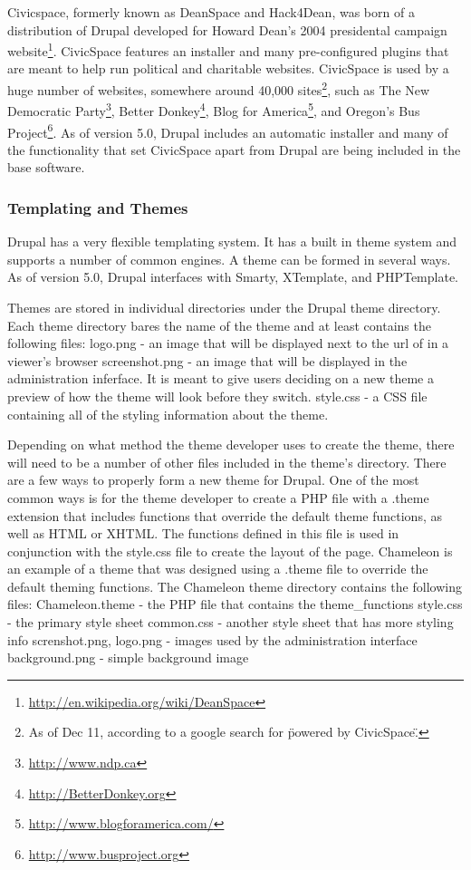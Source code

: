 \documentclass[a4paper,12pt]{report}
\begin{document}
Civicspace, formerly known as DeanSpace and Hack4Dean, was born of a distribution of Drupal developed for Howard Dean's 2004 presidental campaign website\footnote{\url{ http://en.wikipedia.org/wiki/DeanSpace}}.
CivicSpace features an installer and many pre-configured plugins that are meant to help run political and charitable websites.
CivicSpace is used by a huge number of websites, somewhere around 40,000 sites\footnote{As of Dec 11, according to a google search for \"powered by CivicSpace\".}, such as The New Democratic Party\footnote{\url{ http://www.ndp.ca}}, Better Donkey\footnote{\url{http://BetterDonkey.org}}, Blog for America\footnote{\url{ http://www.blogforamerica.com/}}, and Oregon's Bus Project\footnote{\url{http://www.busproject.org}}.
As of version 5.0, Drupal includes an automatic installer and many of the functionality that set CivicSpace apart from Drupal are being included in the base software.

\subsubsection {Templating and Themes}
Drupal has a very flexible templating system. 
It has a built in theme system and supports a number of common engines. 
A theme can be formed in several ways. 
As of version 5.0, Drupal interfaces with Smarty, XTemplate, and PHPTemplate. 

Themes are stored in individual directories under the Drupal theme directory. 
Each theme directory bares the name of the theme and at least contains the following files:
logo.png - an image that will be displayed next to the url of in a viewer's browser
screenshot.png - an image that will be displayed in the administration inferface. 
It is meant to give users deciding on a new theme a preview of how the theme will look before they switch. 
style.css - a CSS file containing all of the styling information about the theme. 

Depending on what method the theme developer uses to create the theme, there will need to be a number of other files included in the theme's directory. 
There are a few ways to properly form a new theme for Drupal. 
One of the most common ways is for the theme developer to create a PHP file with a .theme extension that includes functions that override the default theme functions, as well as HTML or XHTML. 
The functions defined in this file is used in conjunction with the style.css file to create the layout of the page. 
Chameleon is an example of a theme that was designed using a .theme file to override the default theming functions.
The Chameleon theme directory contains the following files: 
Chameleon.theme - the PHP file that contains the theme\_functions 
style.css - the primary style sheet
common.css -  another style sheet that has more styling info
screnshot.png, logo.png - images used by the administration interface
background.png - simple background image
\end{document}
